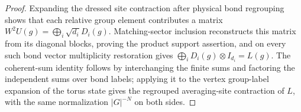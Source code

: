 \begin{proof}\leanok
    Expanding the dressed site contraction after physical bond regrouping
    shows that each relative group element contributes a matrix
    $W^2U(g)=\bigoplus_i\sqrt{d_i}D_i(g)$.
    Matching-sector inclusion reconstructs this matrix from its diagonal
    blocks, proving the product support assertion, and on every such bond vector
    multiplicity restoration gives $\bigoplus_iD_i(g)\otimes I_{d_i}=L(g)$.
    The coherent-sum identity follows by interchanging the finite sums and
    factoring the independent sums over bond labels; applying it to the vertex
    group-label expansion of the torus state gives
    the regrouped averaging-site contraction of $L$, with the same normalization
    $|G|^{-N}$ on both sides.
\end{proof}
